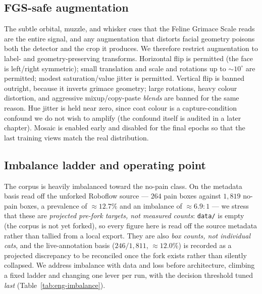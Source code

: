 \subsection{FGS-safe augmentation}
\label{sec:eng-detector-aug}

The subtle orbital, muzzle, and whisker cues that the Feline Grimace Scale
reads are the entire signal, and any augmentation that distorts facial geometry
poisons both the detector and the crop it produces. We therefore restrict
augmentation to label- and geometry-preserving transforms. Horizontal flip is
permitted (the face is left/right symmetric); small translation and scale and
rotations up to $\sim 10^{\circ}$ are permitted; modest saturation/value jitter
is permitted. Vertical flip is banned outright, because it inverts grimace
geometry; large rotations, heavy colour distortion, and aggressive
mixup/copy-paste \emph{blends} are banned for the same reason. Hue jitter is
held near zero, since coat colour is a capture-condition confound we do not wish
to amplify (the confound itself is audited in a later chapter). Mosaic is
enabled early and disabled for the final epochs so that the last training views
match the real distribution.

\subsection{Imbalance ladder and operating point}
\label{sec:eng-detector-imbalance}

The corpus is heavily imbalanced toward the no-pain class. On the metadata
basis read off the unforked Roboflow source --- $264$ pain boxes against
$1{,}819$ no-pain boxes, a prevalence of $\approx 12.7\%$ and an imbalance of
$\approx 6.9{:}1$ --- we stress that these are \emph{projected pre-fork targets,
not measured counts}: \texttt{data/} is empty (the corpus is not yet forked),
so every figure here is read off the source metadata rather than tallied from a
local export. They are also \emph{box counts, not individual cats}, and the
live-annotation basis ($246/1{,}811$, $\approx 12.0\%$) is recorded as a
projected discrepancy to be reconciled once the fork exists rather than silently
collapsed. We address imbalance with data and
loss before architecture, climbing a fixed ladder and changing one lever per
run, with the decision threshold tuned \emph{last}
(Table~\ref{tab:eng-imbalance}).


